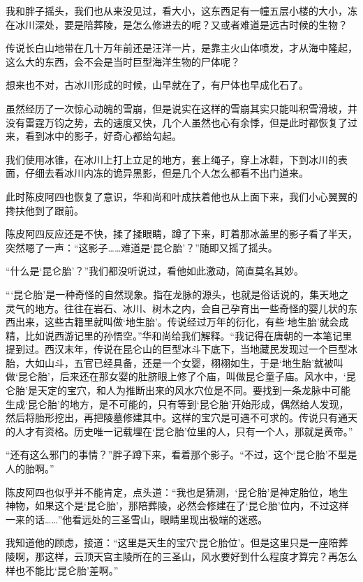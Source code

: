 我和胖子摇头，我们也从来没见过，看大小，这东西足有一幢五层小楼的大小，冻在冰川深处，要是陪葬陵，是怎么修进去的呢？又或者难道是远古时候的生物？

传说长白山地带在几十万年前还是汪洋一片，是靠主火山体喷发，才从海中隆起，这么大的东西，会不会是当时巨型海洋生物的尸体呢？

想来也不对，古冰川形成的时候，山早就在了，有尸体也早成化石了。

虽然经历了一次惊心动魄的雪崩，但是说实在这样的雪崩其实只能叫积雪滑坡，并没有雷霆万钧之势，去的速度又快，几个人虽然也心有余悸，但是此时都恢复了过来，看到冰中的影子，好奇心都给勾起。

我们使用冰锥，在冰川上打上立足的地方，套上绳子，穿上冰鞋，下到冰川的表面，仔细去看冰川内冻的诡异黑影，但是几个人怎么都看不出门道来。

此时陈皮阿四也恢复了意识，华和尚和叶成扶着他也从上面下来，我们小心翼翼的搀扶他到了跟前。

陈皮阿四反应还是不快，揉了揉眼睛，蹲了下来，盯着那冰盖里的影子看了半天，突然嗯了一声：“这影子……难道是‘昆仑胎’？”随即又摇了摇头。

“什么是‘昆仑胎’？”我们都没听说过，看他如此激动，简直莫名其妙。

“‘昆仑胎’是一种奇怪的自然现象。指在龙脉的源头，也就是俗话说的，集天地之灵气的地方。往往在岩石、冰川、树木之内，会自己孕育出一些奇怪的婴儿状的东西出来，这些古籍里就叫做‘地生胎’。传说经过万年的衍化，有些‘地生胎’就会成精，比如说西游记里的孙悟空。”华和尚给我们解释。“我记得在唐朝的一本笔记里提到过。西汉末年，传说在昆仑山的巨型冰斗下底下，当地藏民发现过一个巨型冰胎，大如山斗，五官已经具备，还是一个女婴，栩栩如生，于是‘地生胎’就被叫做‘昆仑胎’，后来还在那女婴的肚脐眼上修了个庙，叫做昆仑童子庙。风水中，‘昆仑胎’是天定的宝穴，和人为推断出来的风水穴位是不同。要找到一条龙脉中可能生成‘昆仑胎’的地方，是不可能的，只有等到‘昆仑胎’开始形成，偶然给人发现，然后将胎形挖出，再把陵墓修建其中。这样的宝穴是可遇不可求的。传说只有通天的人才有资格。历史唯一记载埋在‘昆仑胎’位里的人，只有一个人，那就是黄帝。”

“还有这么邪门的事情？”胖子蹲下来，看着那个影子。“不过，这个‘昆仑胎’不型是人的胎啊。”

陈皮阿四也似乎并不能肯定，点头道：“我也是猜测，‘昆仑胎’是神定胎位，地生神物，如果这个是‘昆仑胎’，那陪葬陵，必然会修建在了‘昆仑胎’位内，不过这样一来的话……”他看远处的三圣雪山，眼睛里现出极端的迷惑。

我知道他的顾虑，接道：“这里是天生的宝穴‘昆仑胎位’。但是这里只是一座陪葬陵啊，那这样，云顶天宫主陵所在的三圣山，风水要好到什么程度才算完？再怎么样也不能比‘昆仑胎’差啊。”

